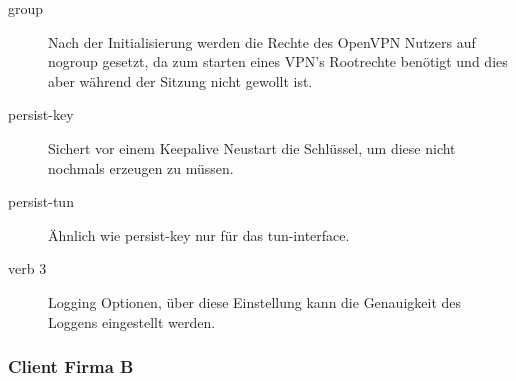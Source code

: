 \begin{description}
	\item[group]Nach der Initialisierung werden die Rechte des OpenVPN Nutzers auf nogroup gesetzt, da zum starten eines VPN's Rootrechte benötigt und dies aber während der Sitzung nicht gewollt ist.
	\item[persist-key] Sichert vor einem Keepalive Neustart die Schlüssel, um diese nicht nochmals erzeugen zu müssen.
	\item[persist-tun] Ähnlich wie persist-key nur für das tun-interface.  
	\item[verb 3] Logging Optionen, über diese Einstellung kann die Genauigkeit des Loggens eingestellt werden.
\end{description}




\subsubsection{Client Firma B}










